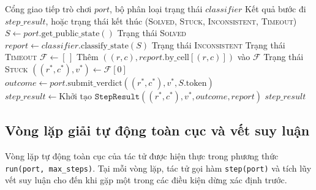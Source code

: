 \begin{algorithm}[H]
\caption{Một bước suy luận của tác tử \textsc{DeductiveLogicAgentStep}}
\label{alg:deductive-agent-step}
\begin{algorithmic}[1]
\REQUIRE Cổng giao tiếp trò chơi $port$, bộ phân loại trạng thái $classifier$
\ENSURE Kết quả bước đi $step\_result$, hoặc trạng thái kết thúc (\textsc{Solved}, \textsc{Stuck}, \textsc{Inconsistent}, \textsc{Timeout})
\STATE $S \leftarrow port.\text{get\_public\_state}()$
    \RETURN Trạng thái \textsc{Solved}
\ENDIF
\STATE $report \leftarrow classifier.\text{classify\_state}(S)$
    \RETURN Trạng thái \textsc{Inconsistent}
    \RETURN Trạng thái \textsc{Timeout}
\ENDIF
\STATE $\mathcal{F} \leftarrow [\,]$ 
        \STATE Thêm $((r, c), report.\text{by\_cell}[(r, c)])$ vào $\mathcal{F}$
    \ENDIF
\ENDFOR
{}
    \RETURN Trạng thái \textsc{Stuck} 
\ENDIF
\STATE $((r^*, c^*), v^*) \leftarrow \mathcal{F}[0]$ 
\STATE $outcome \leftarrow port.\text{submit\_verdict}((r^*, c^*), v^*, S.\text{token})$
\STATE $step\_result \leftarrow \text{Khởi tạo } \texttt{StepResult}((r^*, c^*), v^*, outcome, report)$
\RETURN $step\_result$
\end{algorithmic}
\end{algorithm}

\subsection{Vòng lặp giải tự động toàn cục và vết suy luận}
\label{subsec:full-loop}

Vòng lặp tự động toàn cục của tác tử được hiện thực trong phương thức \texttt{run(port, max\_steps)}. Tại mỗi vòng lặp, tác tử gọi hàm \texttt{step(port)} và tích lũy vết suy luận cho đến khi gặp một trong các điều kiện dừng xác định trước.

